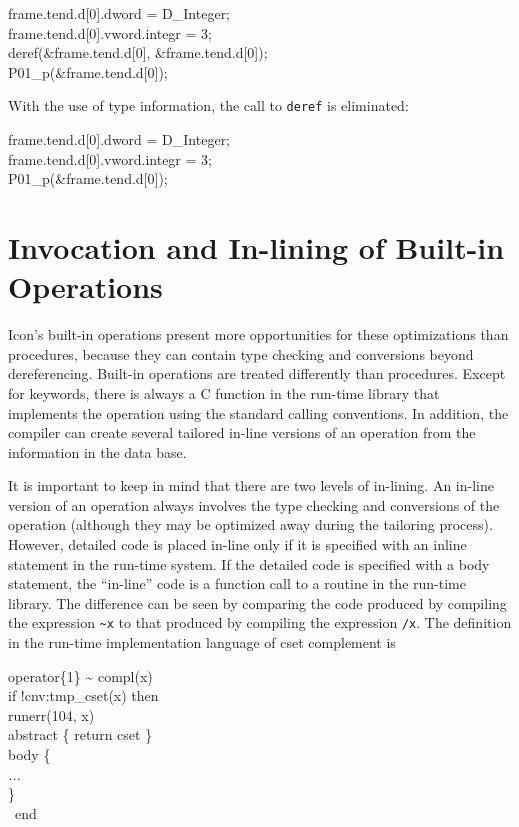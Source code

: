 \goodbreak
\begin{iconcode}
\>frame.tend.d[0].dword = D\_Integer;\\
\>frame.tend.d[0].vword.integr = 3;\\
\>deref(\&frame.tend.d[0], \&frame.tend.d[0]);\\
\>P01\_p(\&frame.tend.d[0]);\\
\end{iconcode}

\noindent
With the use of type information, the call to \texttt{deref} is eliminated: 

\goodbreak
\begin{iconcode}
\>frame.tend.d[0].dword = D\_Integer;\\
\>frame.tend.d[0].vword.integr = 3;\\
\>P01\_p(\&frame.tend.d[0]);\\
\end{iconcode}

\section{Invocation and In-lining of Built-in Operations}

Icon's built-in operations present more opportunities for these
optimizations than procedures, because they can contain type checking
and conversions beyond dereferencing. Built-in operations are treated
differently than procedures. Except for keywords, there is always a C
function in the run-time library that implements the operation using
the standard calling conventions. In addition, the compiler can create
several tailored in-line versions of an operation from the information
in the data base.

It is important to keep in mind that there are two levels of
in-lining. An in-line version of an operation always involves the type
checking and conversions of the operation (although they may be
optimized away during the tailoring process). However, detailed code
is placed in-line only if it is specified with an inline statement in
the run-time system. If the detailed code is specified with a body
statement, the ``in-line'' code is a function call to a routine in the
run-time library. The difference can be seen by comparing the code
produced by compiling the expression \texttt{\textasciitilde{}x} to
that produced by compiling the expression \texttt{/x}. The definition
in the run-time implementation language of cset complement is

\goodbreak
\begin{iconcode}
\>operator\{1\} \textasciitilde{} compl(x)\\
\>\>if !cnv:tmp\_cset(x) then\\
\>\>\>runerr(104, x)\\
\>\>abstract \{ return cset \}\\
\>\>body \{\\
\>\>\textit{...}\\
\>\>\}\\
\>\ end\\
\end{iconcode}


